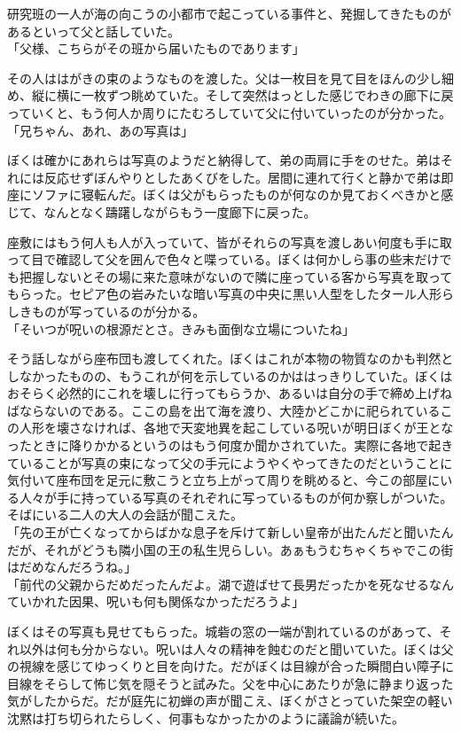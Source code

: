 \documentclass[b5j,twoside,twocolumn]{utarticle}
\begin{document}
研究班の一人が海の向こうの小都市で起こっている事件と、発掘してきたものがあるといって父と話していた。\\
「父様、こちらがその班から届いたものであります」


その人ははがきの束のようなものを渡した。父は一枚目を見て目をほんの少し細め、縦に横に一枚ずつ眺めていた。そして突然はっとした感じでわきの廊下に戻っていくと、もう何人か周りにたむろしていて父に付いていったのが分かった。\\
「兄ちゃん、あれ、あの写真は」


ぼくは確かにあれらは写真のようだと納得して、弟の両肩に手をのせた。弟はそれには反応せずぼんやりとしたあくびをした。居間に連れて行くと静かで弟は即座にソファに寝転んだ。ぼくは父がもらったものが何なのか見ておくべきかと感じて、なんとなく躊躇しながらもう一度廊下に戻った。


座敷にはもう何人も人が入っていて、皆がそれらの写真を渡しあい何度も手に取って目で確認して父を囲んで色々と喋っている。ぼくは何かしら事の些末だけでも把握しないとその場に来た意味がないので隣に座っている客から写真を取ってもらった。セピア色の岩みたいな暗い写真の中央に黒い人型をしたタール人形らしきものが写っているのが分かる。\\
「そいつが呪いの根源だとさ。きみも面倒な立場についたね」


そう話しながら座布団も渡してくれた。ぼくはこれが本物の物質なのかも判然としなかったものの、もうこれが何を示しているのかははっきりしていた。ぼくはおそらく必然的にこれを壊しに行ってもらうか、あるいは自分の手で締め上げねばならないのである。ここの島を出て海を渡り、大陸かどこかに祀られているこの人形を壊さなければ、各地で天変地異を起こしている呪いが明日ぼくが王となったときに降りかかるというのはもう何度か聞かされていた。実際に各地で起きていることが写真の束になって父の手元にようやくやってきたのだということに気付いて座布団を足元に敷こうと立ち上がって周りを眺めると、今この部屋にいる人々が手に持っている写真のそれぞれに写っているものが何か察しがついた。そばにいる二人の大人の会話が聞こえた。\\
「先の王が亡くなってからばかな息子を斥けて新しい皇帝が出たんだと聞いたんだが、それがどうも隣小国の王の私生児らしい。あぁもうむちゃくちゃでこの街はだめなんだろうね。」\\
「前代の父親からだめだったんだよ。湖で遊ばせて長男だったかを死なせるなんていかれた因果、呪いも何も関係なかっただろうよ」


ぼくはその写真も見せてもらった。城砦の窓の一端が割れているのがあって、それ以外は何も分からない。呪いは人々の精神を蝕むのだと聞いていた。ぼくは父の視線を感じてゆっくりと目を向けた。だがぼくは目線が合った瞬間白い障子に目線をそらして怖じ気を隠そうと試みた。父を中心にあたりが急に静まり返った気がしたからだ。だが庭先に初蝉の声が聞こえ、ぼくがさとっていた架空の軽い沈黙は打ち切られたらしく、何事もなかったかのように議論が続いた。
\end{document}

